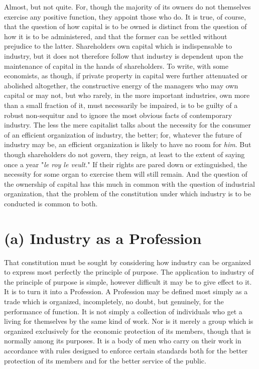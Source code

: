 \documentclass{book}
\begin{document}
Almost, but not quite. For, though the majority of its owners do not themselves exercise any positive function, they appoint those who do. It is true, of course, that the question of how capital is to be owned is distinct from the question of how it is to be administered, and that the former can be settled without prejudice to the latter. Shareholders own capital which is indispensable to industry, but it does not therefore follow that industry is dependent upon the maintenance of capital in the hands of shareholders. To write, with some economists, as though, if private property in capital were further attenuated or abolished altogether, the constructive energy of the managers who may own capital or may not, but who rarely, in the more important industries, own more than a small fraction of it, must necessarily be impaired, is to be guilty of a robust non-sequitur and to ignore the most obvious facts of contemporary industry. The less the mere capitalist talks about the necessity for the consumer of an efficient organization of industry, the better; for, whatever the future of industry may be, an efficient organization is likely to have no room for \emph{him}. But though shareholders do not govern, they reign, at least to the extent of saying once a year "\emph{le roy le veult.}" If their rights are pared down or extinguished, the necessity for some organ to exercise them will still remain. And the question of the ownership of capital has this much in common with the question of industrial organization, that the problem of the constitution under which industry is to be conducted is common to both.

\section{(a) Industry as a Profession}
That constitution must be sought by considering how industry can be organized to express most perfectly the principle of purpose. The application to industry of the principle of purpose is simple, however difficult it may be to give effect to it. It is to turn it into a Profession. A Profession may be defined most simply as a trade which is organized, incompletely, no doubt, but genuinely, for the performance of function. It is not simply a collection of individuals who get a living for themselves by the same kind of work. Nor is it merely a group which is organized exclusively for the economic protection of its members, though that is normally among its purposes. It is a body of men who carry on their work in accordance with rules designed to enforce certain standards both for the better protection of its members and for the better service of the public.
\end{document}
